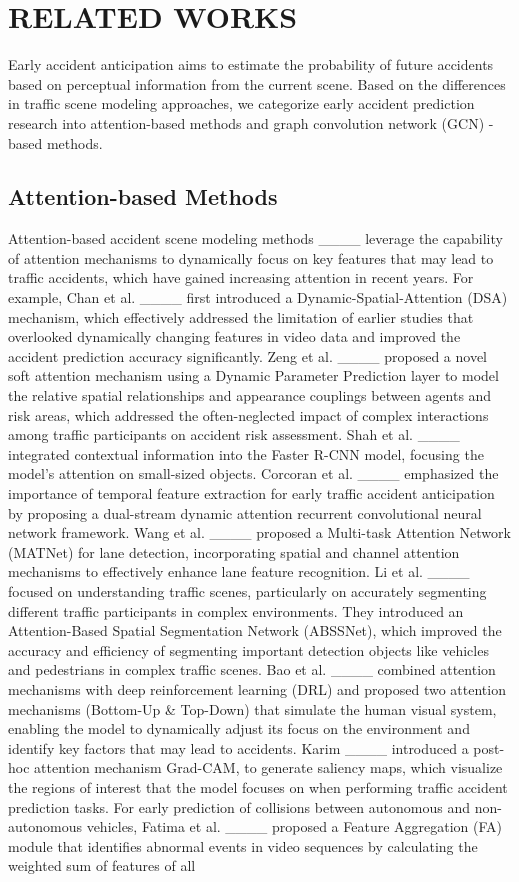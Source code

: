 \section{RELATED WORKS}
\label{sec2}

Early accident anticipation aims to estimate the probability of future accidents based on perceptual information from the current scene. Based on the differences in traffic scene modeling approaches, we categorize early accident prediction research into attention-based methods and graph convolution network (GCN) -based methods.
\subsection{Attention-based Methods}

Attention-based accident scene modeling methods ____ leverage the capability of attention mechanisms to dynamically focus on key features that may lead to traffic accidents, which have gained increasing attention in recent years. For example, Chan et al. ____ first introduced a Dynamic-Spatial-Attention (DSA) mechanism, which effectively addressed the limitation of earlier studies that overlooked dynamically changing features in video data and improved the accident prediction accuracy significantly. Zeng et al. ____ proposed a novel soft attention mechanism using a Dynamic Parameter Prediction layer to model the relative spatial relationships and appearance couplings between agents and risk areas, which addressed the often-neglected impact of complex interactions among traffic participants on accident risk assessment. Shah et al. ____ integrated contextual information into the Faster R-CNN model, focusing the model's attention on small-sized objects. Corcoran et al. ____ emphasized the importance of temporal feature extraction for early traffic accident anticipation by proposing a dual-stream dynamic attention recurrent convolutional neural network framework. Wang et al. ____ proposed a Multi-task Attention Network (MATNet) for lane detection, incorporating spatial and channel attention mechanisms to effectively enhance lane feature recognition. Li et al. ____ focused on understanding traffic scenes, particularly on accurately segmenting different traffic participants in complex environments. They introduced an Attention-Based Spatial Segmentation Network (ABSSNet), which improved the accuracy and efficiency of segmenting important detection objects like vehicles and pedestrians in complex traffic scenes. Bao et al. ____ combined attention mechanisms with deep reinforcement learning (DRL) and proposed two attention mechanisms (Bottom-Up \& Top-Down) that simulate the human visual system, enabling the model to dynamically adjust its focus on the environment and identify key factors that may lead to accidents. Karim ____ introduced a post-hoc attention mechanism Grad-CAM, to generate saliency maps, which visualize the regions of interest that the model focuses on when performing traffic accident prediction tasks. For early prediction of collisions between autonomous and non-autonomous vehicles, Fatima et al. ____ proposed a Feature Aggregation (FA) module that identifies abnormal events in video sequences by calculating the weighted sum of features of all 
